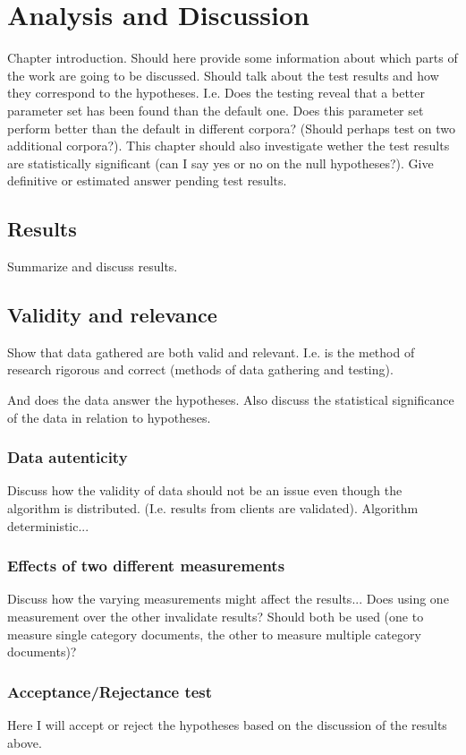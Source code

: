 
\chapter{Analysis and Discussion} %

\label{AnalysisAndDiscussion}



Chapter introduction. Should here provide some information about which parts of the work are going to be discussed.
Should talk about the test results and how they correspond to the hypotheses. I.e. Does the testing reveal that a
better parameter set has been found than the default one. Does this parameter set perform better than the default
in different corpora? (Should perhaps test on two additional corpora?). This chapter should also investigate wether
the test results are statistically significant (can I say yes or no on the null hypotheses?). Give definitive or
estimated answer pending test results.

\section{Results}
\label{Results}
Summarize and discuss results.

\section{Validity and relevance}
\label{ValidityRelevance}
Show that data gathered are both valid and relevant. I.e. is the method of research rigorous and correct (methods of data gathering and testing).

And does the data answer the hypotheses. Also discuss the statistical significance of the data in relation to hypotheses.

\subsection{Data autenticity}
Discuss how the validity of data should not be an issue even though the algorithm is distributed. (I.e. results from clients are validated).
Algorithm deterministic...

\subsection{Effects of two different measurements}
Discuss how the varying measurements might affect the results... Does using one measurement over the
other invalidate results? Should both be used (one to measure single category documents, the other to 
measure multiple category documents)?


\subsection{Acceptance/Rejectance test}
Here I will accept or reject the hypotheses based on the discussion of the results above.